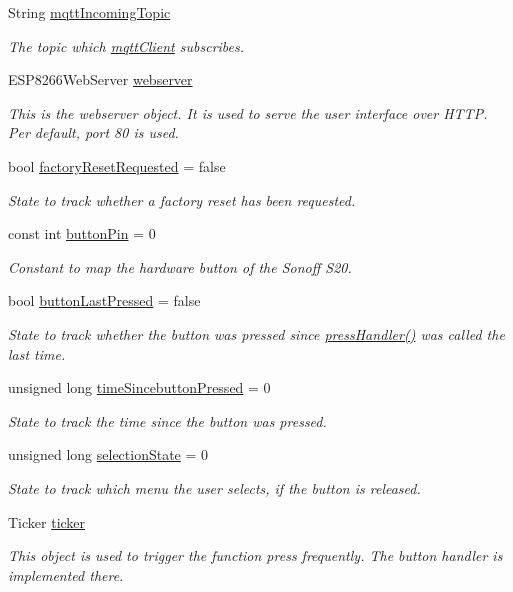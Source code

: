 \begin{DoxyCompactItemize}
String \hyperlink{WIFIOnOff_8ino_a686cf2365a7075bc5f72d01c99b3a9f2}{mqtt\-Incoming\-Topic}
\begin{DoxyCompactList}\small\item\em The topic which \hyperlink{WIFIOnOff_8ino_a0524591f2a058a4f26f16579245db356}{mqtt\-Client} subscribes. \end{DoxyCompactList}\item 
E\-S\-P8266\-Web\-Server \hyperlink{WIFIOnOff_8ino_a0c2e905cdd4621947a7d6c966383e28c}{webserver}
\begin{DoxyCompactList}\small\item\em This is the webserver object. It is used to serve the user interface over H\-T\-T\-P. Per default, port 80 is used. \end{DoxyCompactList}\item 
bool \hyperlink{WIFIOnOff_8ino_a4768e99cded5c5493ba789b0555c80fc}{factory\-Reset\-Requested} = false
\begin{DoxyCompactList}\small\item\em State to track whether a factory reset has been requested. \end{DoxyCompactList}\item 
const int \hyperlink{WIFIOnOff_8ino_a4ddb8b6ae564eb22f7c74f2683a63b8e}{button\-Pin} = 0
\begin{DoxyCompactList}\small\item\em Constant to map the hardware button of the Sonoff S20. \end{DoxyCompactList}\item 
bool \hyperlink{WIFIOnOff_8ino_a80700674ee3f9a7b6ae86b0756679902}{button\-Last\-Pressed} = false
\begin{DoxyCompactList}\small\item\em State to track whether the button was pressed since \hyperlink{WIFIOnOff_8ino_acd4d58af93c899ee9a03131727b1cf34}{press\-Handler()} was called the last time. \end{DoxyCompactList}\item 
unsigned long \hyperlink{WIFIOnOff_8ino_a244ed52f592c09418e6feee15f1cecd5}{time\-Sincebutton\-Pressed} = 0
\begin{DoxyCompactList}\small\item\em State to track the time since the button was pressed. \end{DoxyCompactList}\item 
unsigned long \hyperlink{WIFIOnOff_8ino_a969fb5df6fd687b0434058fa78c25f27}{selection\-State} = 0
\begin{DoxyCompactList}\small\item\em State to track which menu the user selects, if the button is released. \end{DoxyCompactList}\item 
Ticker \hyperlink{WIFIOnOff_8ino_a4bb2542b2738619fdf76b685b10e315d}{ticker}
\begin{DoxyCompactList}\small\item\em This object is used to trigger the function press frequently. The button handler is implemented there. \end{DoxyCompactList}\end{DoxyCompactItemize}


